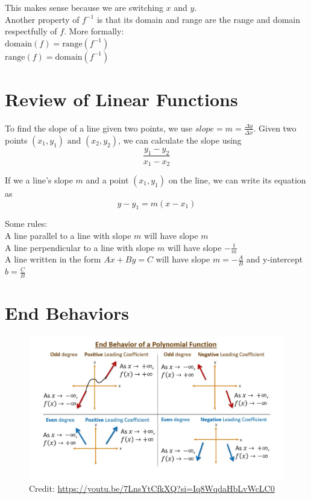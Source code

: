 \documentclass[12pt]{article}
\begin{document}
This makes sense because we are switching \(x\) and \(y\).\\

Another property of \(f^{-1}\) is that its domain and range are the range and domain respectfully of \(f\). More formally:\\

\(\text{domain}(f)=\text{range}(f^{-1})\)\\

\(\text{range}(f)=\text{domain}(f^{-1})\)\\

\section{Review of Linear Functions}

To find the slope of a line given two points, we use \(slope = m = \frac{\Delta y}{\Delta x}\). Given two points \((x_1,y_1) \text{ and } (x_2, y_2)\), we can calculate the slope using\\

\[\frac{y_1-y_2}{x_1-x_2}\]

If we a line's slope \(m\) and a point \((x_1,y_1)\) on the line, we can write its equation as\\

\[y-y_1=m(x-x_1)\]

Some rules:\\
A line parallel to a line with slope \(m\) will have slope \(m\)\\
A line perpendicular to a line with slope \(m\) will have slope \(-\frac{1}{m}\)\\
A line written in the form \(Ax+By=C\) will have slope \(m=-\frac{A}{B}\) and y-intercept \(b=\frac{C}{B}\)\\

\section{End Behaviors}

\begin{figure}[H]
	\centering
	\includegraphics[scale=0.4]{ends.jpg}
	\caption{Credit: \url{https://youtu.be/7LnsYtCfkXQ?si=Iq8WqdaHbLvWcLC0}}
\end{figure}
\end{document}
